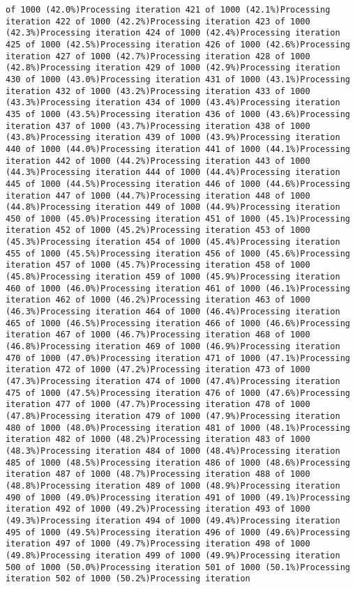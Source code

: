 \documentclass[
]{article}
\begin{document}
\begin{verbatim}
of 1000 (42.0%)Processing iteration 421 of 1000 (42.1%)Processing iteration 422 of 1000 (42.2%)Processing iteration 423 of 1000 (42.3%)Processing iteration 424 of 1000 (42.4%)Processing iteration 425 of 1000 (42.5%)Processing iteration 426 of 1000 (42.6%)Processing iteration 427 of 1000 (42.7%)Processing iteration 428 of 1000 (42.8%)Processing iteration 429 of 1000 (42.9%)Processing iteration 430 of 1000 (43.0%)Processing iteration 431 of 1000 (43.1%)Processing iteration 432 of 1000 (43.2%)Processing iteration 433 of 1000 (43.3%)Processing iteration 434 of 1000 (43.4%)Processing iteration 435 of 1000 (43.5%)Processing iteration 436 of 1000 (43.6%)Processing iteration 437 of 1000 (43.7%)Processing iteration 438 of 1000 (43.8%)Processing iteration 439 of 1000 (43.9%)Processing iteration 440 of 1000 (44.0%)Processing iteration 441 of 1000 (44.1%)Processing iteration 442 of 1000 (44.2%)Processing iteration 443 of 1000 (44.3%)Processing iteration 444 of 1000 (44.4%)Processing iteration 445 of 1000 (44.5%)Processing iteration 446 of 1000 (44.6%)Processing iteration 447 of 1000 (44.7%)Processing iteration 448 of 1000 (44.8%)Processing iteration 449 of 1000 (44.9%)Processing iteration 450 of 1000 (45.0%)Processing iteration 451 of 1000 (45.1%)Processing iteration 452 of 1000 (45.2%)Processing iteration 453 of 1000 (45.3%)Processing iteration 454 of 1000 (45.4%)Processing iteration 455 of 1000 (45.5%)Processing iteration 456 of 1000 (45.6%)Processing iteration 457 of 1000 (45.7%)Processing iteration 458 of 1000 (45.8%)Processing iteration 459 of 1000 (45.9%)Processing iteration 460 of 1000 (46.0%)Processing iteration 461 of 1000 (46.1%)Processing iteration 462 of 1000 (46.2%)Processing iteration 463 of 1000 (46.3%)Processing iteration 464 of 1000 (46.4%)Processing iteration 465 of 1000 (46.5%)Processing iteration 466 of 1000 (46.6%)Processing iteration 467 of 1000 (46.7%)Processing iteration 468 of 1000 (46.8%)Processing iteration 469 of 1000 (46.9%)Processing iteration 470 of 1000 (47.0%)Processing iteration 471 of 1000 (47.1%)Processing iteration 472 of 1000 (47.2%)Processing iteration 473 of 1000 (47.3%)Processing iteration 474 of 1000 (47.4%)Processing iteration 475 of 1000 (47.5%)Processing iteration 476 of 1000 (47.6%)Processing iteration 477 of 1000 (47.7%)Processing iteration 478 of 1000 (47.8%)Processing iteration 479 of 1000 (47.9%)Processing iteration 480 of 1000 (48.0%)Processing iteration 481 of 1000 (48.1%)Processing iteration 482 of 1000 (48.2%)Processing iteration 483 of 1000 (48.3%)Processing iteration 484 of 1000 (48.4%)Processing iteration 485 of 1000 (48.5%)Processing iteration 486 of 1000 (48.6%)Processing iteration 487 of 1000 (48.7%)Processing iteration 488 of 1000 (48.8%)Processing iteration 489 of 1000 (48.9%)Processing iteration 490 of 1000 (49.0%)Processing iteration 491 of 1000 (49.1%)Processing iteration 492 of 1000 (49.2%)Processing iteration 493 of 1000 (49.3%)Processing iteration 494 of 1000 (49.4%)Processing iteration 495 of 1000 (49.5%)Processing iteration 496 of 1000 (49.6%)Processing iteration 497 of 1000 (49.7%)Processing iteration 498 of 1000 (49.8%)Processing iteration 499 of 1000 (49.9%)Processing iteration 500 of 1000 (50.0%)Processing iteration 501 of 1000 (50.1%)Processing iteration 502 of 1000 (50.2%)Processing iteration 
\end{verbatim}
\end{document}

